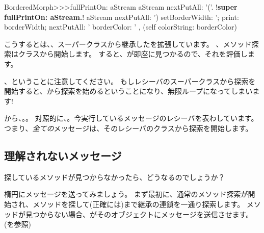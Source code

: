 \documentclass[a4paper,10pt,twoside]{book}
\begin{document}
\begin{method}[fullPrintOn]{}
BorderedMorph>>>fullPrintOn: aStream
	aStream nextPutAll: '('.
	!\textbf{super fullPrintOn: aStream.}!
	aStream nextPutAll: ') setBorderWidth: '; print: borderWidth;
		nextPutAll: ' borderColor: ' , (self colorString: borderColor)
\end{method}
こうするとは、、スーパークラスから継承したを拡張しています。
、メソッド探索はクラスから開始します。
すると、が即座に見つかるので、それを評価します。

、ということに注意してください。
もしレシーバのスーパークラスから探索を開始すると、から探索を始めるということになり、無限ループになってしまいます!


から、。。
対照的に、。今実行しているメッセージのレシーバを表わしています。つまり、\emph{全ての}メッセージは、そのレシーバのクラスから探索を開始します。

\subsection{理解されないメッセージ}

探しているメソッドが見つからなかったら、どうなるのでしょうか？

楕円にメッセージを送ってみましょう。
まず最初に、通常のメソッド探索が開始され、メソッドを探して(正確には)まで継承の連鎖を一通り探索します。
メソッドが見つからない場合、がそのオブジェクトにメッセージを送信させます。(を参照)
\end{document}
